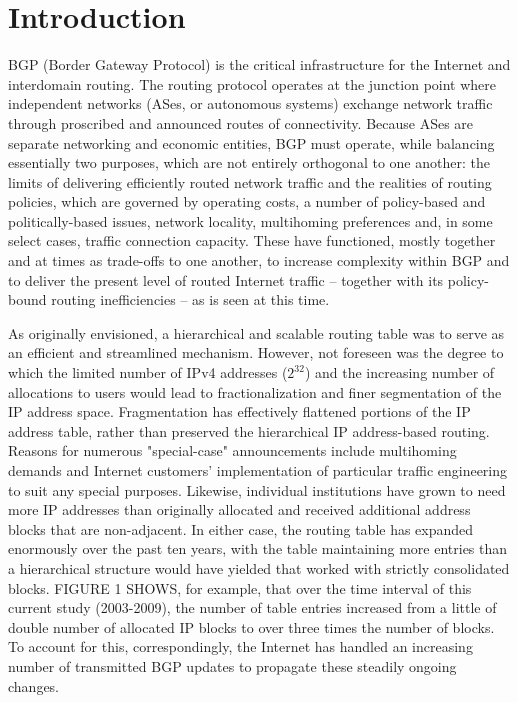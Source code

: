 \section{Introduction}

BGP (Border Gateway Protocol) is the critical infrastructure for the Internet and interdomain routing.  The routing protocol operates at the junction point where independent networks (ASes, or autonomous systems) exchange network traffic through proscribed and announced routes of connectivity.  Because ASes are separate networking and economic entities, BGP must operate, while balancing essentially two purposes, which are not entirely orthogonal to one another: the limits of delivering efficiently routed network traffic and the realities of routing policies, which are governed by operating costs, a number of policy-based and politically-based issues, network locality, multihoming preferences and, in some select cases, traffic connection capacity.  These have functioned, mostly together and at times as trade-offs to one another, to increase complexity within BGP and to deliver the present level of routed Internet traffic -- together with its policy-bound routing inefficiencies -- as is seen at this time.

As originally envisioned, a hierarchical and scalable routing table was to serve as an efficient and streamlined mechanism.  However, not foreseen was the degree to which the limited number of IPv4 addresses ($2^{32}$) and the increasing number of allocations to users would lead to fractionalization and finer segmentation of the IP address space.  Fragmentation has effectively flattened portions of the IP address table, rather than preserved the hierarchical IP address-based routing.  Reasons for numerous "special-case" announcements include multihoming demands and Internet customers' implementation of particular traffic engineering to suit any special purposes.  Likewise, individual institutions have grown to need more IP addresses than originally allocated and received additional address blocks that are non-adjacent.  In either case, the routing table has expanded enormously over the past ten years, with the table maintaining more entries than a hierarchical structure would have yielded that worked with strictly consolidated blocks.  FIGURE 1 SHOWS, for example, that over the time interval of this current study (2003-2009), the number of table entries increased from a little of double number of allocated IP blocks to over three times the number of blocks.  To account for this, correspondingly, the Internet has handled an increasing number of transmitted BGP updates to propagate these steadily ongoing changes.

